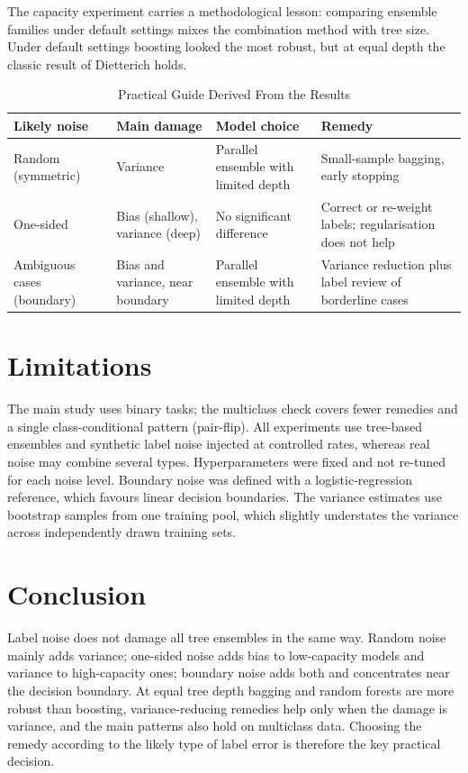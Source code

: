 \documentclass[conference,a4paper]{IEEEtran}
\begin{document}
The capacity experiment carries a methodological lesson: comparing ensemble families under default settings mixes the combination method with tree size. Under default settings boosting looked the most robust, but at equal depth the classic result of Dietterich \cite{dietterich2000} holds.

\begin{table}[!t]
\caption{Practical Guide Derived From the Results}
\label{tab:guide}
\centering
\footnotesize
\setlength{\tabcolsep}{3pt}
\begin{tabular}{@{}L{1.45cm}L{1.6cm}L{1.75cm}L{2.05cm}@{}}
\toprule
Likely noise & Main damage & Model choice & Remedy \\
\midrule
Random (symmetric) & Variance & Parallel ensemble with limited depth & Small-sample bagging, early stopping \\
One-sided & Bias (shallow), variance (deep) & No significant difference & Correct or re-weight labels; regularisation does not help \\
Ambiguous cases (boundary) & Bias and variance, near boundary & Parallel ensemble with limited depth & Variance reduction plus label review of borderline cases \\
\bottomrule
\end{tabular}
\end{table}

\section{Limitations}
The main study uses binary tasks; the multiclass check covers fewer remedies and a single class-conditional pattern (pair-flip). All experiments use tree-based ensembles and synthetic label noise injected at controlled rates, whereas real noise may combine several types. Hyperparameters were fixed and not re-tuned for each noise level. Boundary noise was defined with a logistic-regression reference, which favours linear decision boundaries. The variance estimates use bootstrap samples from one training pool, which slightly understates the variance across independently drawn training sets.

\section{Conclusion}
Label noise does not damage all tree ensembles in the same way. Random noise mainly adds variance; one-sided noise adds bias to low-capacity models and variance to high-capacity ones; boundary noise adds both and concentrates near the decision boundary. At equal tree depth bagging and random forests are more robust than boosting, variance-reducing remedies help only when the damage is variance, and the main patterns also hold on multiclass data. Choosing the remedy according to the likely type of label error is therefore the key practical decision.
\end{document}
